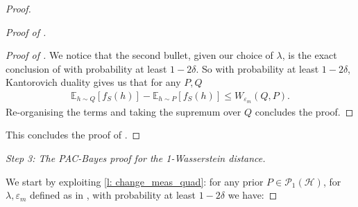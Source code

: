 \begin{noaddcontents}
\begin{proof}
\begin{proof}[Proof of ]
\begin{proof}[Proof of ]
We notice that the second bullet, given our choice of $\lambda$, is the exact conclusion  of  with probability at least $1-2\delta$.
So with probability at least $1-2\delta$, Kantorovich duality gives us that for any $P,Q$
\begin{align*}
\mathbb{E}_{h\sim Q}[ f_S(h)] - \mathbb{E}_{h\sim P}[f_S(h)] \leq W_{\varepsilon_m}(Q,P).
\end{align*}
Re-organising the terms and taking the supremum over $Q$ concludes the proof.
\end{proof}
This concludes the proof of .
\end{proof}

\textit{Step 3: The PAC-Bayes proof for the 1-Wasserstein distance.}

We start by exploiting \cref{l: change_meas_quad}: for any prior $P\in\mathcal{P}_1(\mathcal{H})$, for $\lambda, \varepsilon_m$ defined as in , with probability at least $1-2\delta$ we have:


\end{proof}
\end{noaddcontents}
